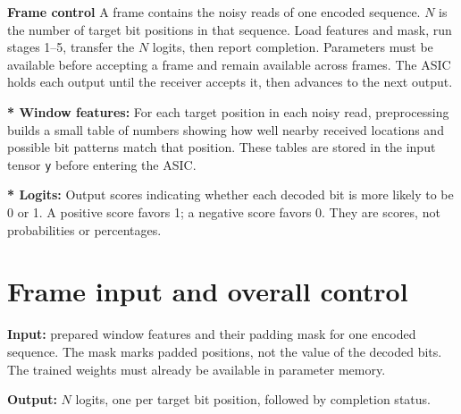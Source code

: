 \documentclass[11pt,a4paper]{article}
\begin{document}
\textbf{Frame control} A frame contains the noisy reads of one encoded sequence. $N$ is the number of target bit positions in that sequence. Load features and mask, run stages 1--5, transfer the $N$ logits, then report completion. Parameters must be available before accepting a frame and remain available across frames. The ASIC holds each output until the receiver accepts it, then advances to the next output.


\textbf{* Window features:} For each target position in each noisy read, preprocessing builds a small table of numbers showing how well nearby received locations and possible bit patterns match that position. These tables are stored in the input tensor \texttt{y} before entering the ASIC.

\textbf{* Logits:} Output scores indicating whether each decoded bit is more likely to be 0 or 1. A positive score favors 1; a negative score favors 0. They are scores, not probabilities or percentages.




\newpage
\section*{Frame input and overall control}
\textbf{Input:} prepared window features and their padding mask for one encoded sequence. The mask marks padded positions, not the value of the decoded bits. The trained weights must already be available in parameter memory.

\textbf{Output:} $N$ logits, one per target bit position, followed by completion status.
\end{document}
